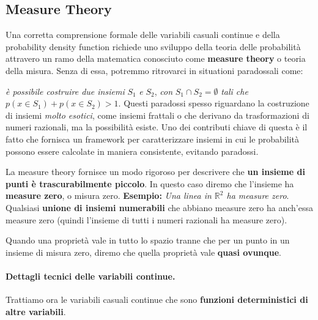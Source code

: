 \subsection{Measure Theory}
Una corretta comprensione formale delle variabili casuali continue e della probability density function richiede uno sviluppo della teoria delle probabilità attravero un ramo della matematica conosciuto come \textbf{measure theory} o teoria della misura.
\newline
\newline
Senza di essa, potremmo ritrovarci in situationi paradossali come:



\textit{è possibile costruire due insiemi} $S_1$ \textit{e} $S_2$, \textit{con} $S_1\cap S_2=\emptyset$ \textit{tali che} $p(x\in S_1)+p(x\in S_2)>1$.
\newline
\newline
Questi paradossi spesso riguardano la costruzione di insiemi \textit{molto esotici}, come insiemi frattali o che derivano da trasformazioni di numeri razionali, ma la possibilità esiste.
\newline
\newline
Uno dei contributi chiave di questa è il fatto che fornisca un framework per caratterizzare insiemi in cui le probabilità possono essere calcolate in maniera consistente, evitando paradossi.


La measure theory fornisce un modo rigoroso per descrivere che \textbf{un insieme di punti è trascurabilmente piccolo}. In questo caso diremo che l'insieme ha \textbf{measure zero}, o misura zero. 
\newline
\textbf{Esempio:}
\textit{Una linea in $\mathbb{R}^2$ ha measure zero}.
\newline
\newline
Qualsiasi \textbf{unione di insiemi numerabili} che abbiano measure zero ha anch'essa measure zero (quindi l'insieme di tutti i numeri razionali ha measure zero).


Quando una proprietà vale in tutto lo spazio tranne che per un punto in un insieme di misura zero, diremo che quella proprietà vale \textbf{quasi ovunque}.



\paragraph{Dettagli tecnici delle variabili continue.} Trattiamo ora le variabili casuali continue che sono \textbf{funzioni deterministici di altre variabili}. 



